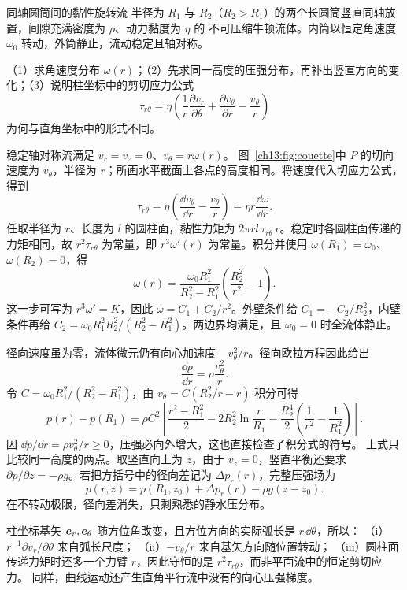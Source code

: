 \begin{origexamplebox}{同轴圆筒间的黏性旋转流}\label{ch13:ex:couette}
半径为 $R_1$ 与 $R_2$（$R_2>R_1$）的两个长圆筒竖直同轴放置，间隙充满密度为 $\rho$、动力黏度为 $\eta$ 的
不可压缩牛顿流体。内筒以恒定角速度 $\omega_0$ 转动，外筒静止，流动稳定且轴对称。

（1）求角速度分布 $\omega(r)$；（2）先求同一高度的压强分布，再补出竖直方向的变化；（3）说明柱坐标中的剪切应力公式
\[
 \tau_{r\theta}=\eta\left(\frac1r\frac{\partial v_r}{\partial\theta}
 +\frac{\partial v_\theta}{\partial r}-\frac{v_\theta}{r}\right)
\]
为何与直角坐标中的形式不同。

\FluidCouetteDiagram
\end{origexamplebox}
\begin{xesolution}
\ThACouette

稳定轴对称流满足 $v_r=v_z=0$、$v_\theta=r\omega(r)$。
图~\ref{ch13:fig:couette}中 $P$ 的切向速度为 $v_\theta$，半径为 $r$；所画水平截面上各点的高度相同。将速度代入切应力公式，得到
\[
 \tau_{r\theta}=\eta\left(\frac{\dd v_\theta}{\dd r}-\frac{v_\theta}{r}\right)
 =\eta r\frac{\dd\omega}{\dd r}.
\]
任取半径为 $r$、长度为 $l$ 的圆柱面，黏性力矩为
$2\pi rl\,\tau_{r\theta}\,r$。稳定时各圆柱面传递的力矩相同，故
$r^2\tau_{r\theta}$ 为常量，即 $r^3\omega'(r)$ 为常量。积分并使用
$\omega(R_1)=\omega_0$、$\omega(R_2)=0$，得
\[
 \boxed{\omega(r)=\frac{\omega_0R_1^2}{R_2^2-R_1^2}
 \left(\frac{R_2^2}{r^2}-1\right)}.
\]
这一步可写为 $r^3\omega'=K$，因此 $\omega=C_1+C_2/r^2$。外壁条件给 $C_1=-C_2/R_2^2$，内壁条件再给
$C_2=\omega_0R_1^2R_2^2/(R_2^2-R_1^2)$。两边界均满足，且 $\omega_0=0$ 时全流体静止。

径向速度虽为零，流体微元仍有向心加速度 $-v_\theta^2/r$。径向欧拉方程因此给出
\[
 \frac{\dd p}{\dd r}=\rho\frac{v_\theta^2}{r}.
\]
令 $C=\omega_0R_1^2/(R_2^2-R_1^2)$，由
$v_\theta=C(R_2^2/r-r)$ 积分可得
\[
 \boxed{p(r)-p(R_1)=\rho C^2\left[
 \frac{r^2-R_1^2}{2}-2R_2^2\ln\frac r{R_1}
 -\frac{R_2^4}{2}\left(\frac1{r^2}-\frac1{R_1^2}\right)
 \right]}.
\]
因 $\dd p/\dd r=\rho v_\theta^2/r\ge0$，压强必向外增大，这也直接检查了积分式的符号。
上式只比较同一高度的两点。取竖直向上为 $z$，由于 $v_z=0$，竖直平衡还要求
$\partial p/\partial z=-\rho g$。若把方括号中的径向差记为 $\Delta p_r(r)$，完整压强场为
\[
 p(r,z)=p(R_1,z_0)+\Delta p_r(r)-\rho g(z-z_0).
\]
在不转动极限，径向差消失，只剩熟悉的静水压分布。

柱坐标基矢 $\bm{e}_r,\bm{e}_\theta$ 随方位角改变，且方位方向的实际弧长是 $r\,\dd\theta$，所以：
（i）$r^{-1}\partial v_r/\partial\theta$ 来自弧长尺度；
（ii）$-v_\theta/r$ 来自基矢方向随位置转动；
（iii）圆柱面传递力矩时还多一个力臂 $r$，因此守恒的是 $r^2\tau_{r\theta}$，而非平面流中的恒定剪切应力。
同样，曲线运动还产生直角平行流中没有的向心压强梯度。
\end{xesolution}

